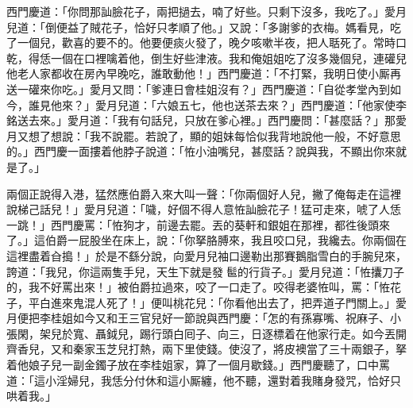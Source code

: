 西門慶道：「你問那訕臉花子，兩把撾去，喃了好些。只剩下沒多，我吃了。」愛月兒道：「倒便益了賊花子，恰好只孝順了他。」{}又說：「多謝爹的衣梅。媽看見，吃了一個兒，歡喜的要不的。他要便痰火發了，晚夕咳嗽半夜，把人聒死了。常時口乾，得恁一個在口裡噙着他，倒生好些津液。我和俺姐姐吃了沒多幾個兒，連礶兒他老人家都收在房內早晚吃，誰敢動他！」西門慶道：「不打緊，我明日使小厮再送一礶來你吃。」愛月又問：「爹連日會桂姐沒有？」西門慶道：「自從孝堂內到如今，誰見他來？」愛月兒道：「六娘五七，他也送茶去來？」西門慶道：「他家使李銘送去來。」愛月道：「我有句話兒，只放在爹心裡。」西門慶問：「甚麼話？」那愛月又想了想說：「我不說罷。{}若說了，顯的姐妹每恰似我背地說他一般，不好意思的。」西門慶一面摟着他脖子說道：「恠小油嘴兒，甚麼話？說與我，不顯出你來就是了。」

兩個正說得入港，猛然應伯爵入來大叫一聲：{}「你兩個好人兒，撇了俺每走在這裡說梯己話兒！」愛月兒道：「噦，好個不得人意恠訕臉花子！猛可走來，唬了人恁一跳！」西門慶罵：「恠狗才，前邊去罷。丟的葵軒和銀姐在那裡，都徃後頭來了。」這伯爵一屁股坐在床上，說：「你拏胳膊來，我且咬口兒，我纔去。你兩個在這裡盡着㒲搗！」於是不繇分說，向愛月兒袖口邊勒出那賽鵝脂雪白的手腕兒來，{}誇道：「我兒，你這兩隻手兒，天生下就是發𩫻䯲的行貨子。」{}{}愛月兒道：「恠攮刀子的，我不好罵出來！」被伯爵拉過來，咬了一口走了。咬得老婆恠叫，罵：「恠花子，平白進來鬼混人死了！」便叫桃花兒：「你看他出去了，把弄道子門關上。」愛月便把李桂姐如今又和王三官兒好一節說與西門慶：「怎的有孫寡嘴、祝麻子、小張閑，架兒於寬、聶鉞兒，踢行頭白囘子、向三，日逐標着在他家行走。如今丟開齊香兒，又和秦家玉芝兒打熱，兩下里使錢。使沒了，將皮襖當了三十兩銀子，拏着他娘子兒一副金鐲子放在李桂姐家，算了一個月歇錢。」西門慶聽了，口中罵道：「這小淫婦兒，我恁分付休和這小厮纏，他不聽，還對着我賭身發咒，恰好只哄着我。」

